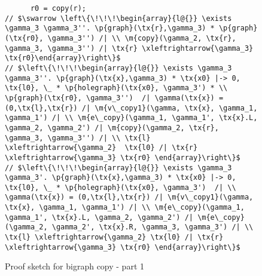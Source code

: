 \begin{figure}
\begin{lstlisting}
      r0 = copy(r);
// $\swarrow \left\{\!\!\!\begin{array}{l@{}} \exists \gamma_3 \gamma_3''. \p{graph}(\tx{r},\gamma_3) * \p{graph}(\tx{r0}, \gamma_3'') /| \\ \m{copy}(\gamma_2, \tx{r}, \gamma_3, \gamma_3'') /| \tx{r} \xleftrightarrow{\gamma_3} \tx{r0}\end{array}\right\}$
// $\left\{\!\!\!\begin{array}{l@{}} \exists \gamma_3 \gamma_3''. \p{graph}(\tx{x},\gamma_3) * \tx{x0} |-> 0, \tx{l0}, \_ * \p{holegraph}(\tx{x0}, \gamma_3') * \\ \p{graph}(\tx{r0}, \gamma_3'')  /| \gamma(\tx{x}) = (0,\tx{l},\tx{r}) /| \m{v\_copy1}(\gamma, \tx{x}, \gamma_1, \gamma_1') /| \\ \m{e\_copy}(\gamma_1, \gamma_1', \tx{x}.L, \gamma_2, \gamma_2') /| \m{copy}(\gamma_2, \tx{r}, \gamma_3, \gamma_3'') /| \\ \tx{l} \xleftrightarrow{\gamma_2}  \tx{l0} /| \tx{r} \xleftrightarrow{\gamma_3} \tx{r0} \end{array}\right\}$
// $\left\{\!\!\!\begin{array}{l@{}} \exists \gamma_3 \gamma_3'. \p{graph}(\tx{x},\gamma_3) * \tx{x0} |-> 0, \tx{l0}, \_ * \p{holegraph}(\tx{x0}, \gamma_3')  /| \\ \gamma(\tx{x}) = (0,\tx{l},\tx{r}) /| \m{v\_copy1}(\gamma, \tx{x}, \gamma_1, \gamma_1') /| \\ \m{e\_copy}(\gamma_1, \gamma_1', \tx{x}.L, \gamma_2, \gamma_2') /| \m{e\_copy}(\gamma_2, \gamma_2', \tx{x}.R, \gamma_3, \gamma_3') /| \\ \tx{l} \xleftrightarrow{\gamma_2} \tx{l0} /| \tx{r} \xleftrightarrow{\gamma_3} \tx{r0} \end{array}\right\}$
  \end{lstlisting}
\caption{Proof sketch for bigraph copy - part 1}
\label{fig:copy-part1}
\end{figure}

\newpage 

